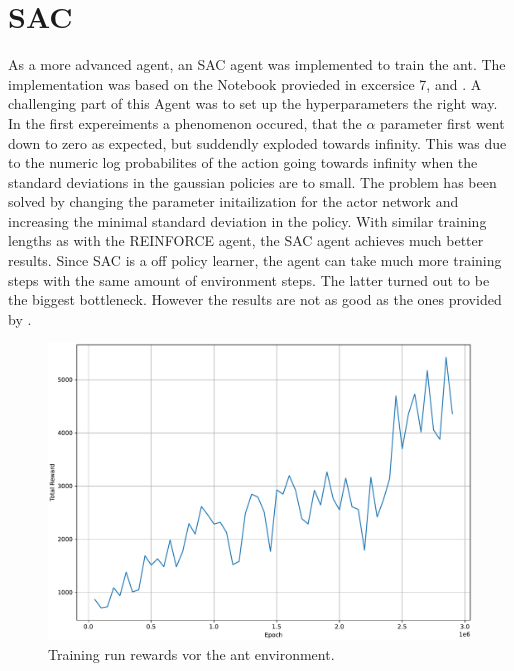 \documentclass[11pt, a4paper]{article}
\begin{document}
\newpage
\section{SAC}
As a more advanced agent, an SAC agent was implemented to train the ant.
The implementation was based on the Notebook provieded in excersice 7, and \cite{haarnoja2018soft}.
A challenging part of this Agent was to set up the hyperparameters the right way.
In the first expereiments a phenomenon occured, that the $\alpha$ parameter first went down to zero as
expected, but suddendly exploded towards infinity.
This was due to the numeric log probabilites of the action going towards infinity when the standard deviations
in the gaussian policies are to small.
The problem has been solved by changing the parameter initailization for the actor network and increasing the minimal
standard deviation in the policy.
With similar training lengths as with the REINFORCE agent, the SAC agent achieves much better results.
Since SAC is a off policy learner, the agent can take much more training steps with the same amount of environment steps.
The latter turned out to be the biggest bottleneck.
However the results are not as good as the ones provided by \cite{haarnoja2018soft}.

\begin{figure}
    \centering
    \includegraphics[width=15cm]{test.pdf}
    \caption{Training run rewards vor the ant environment.}
    \label{SAC:test}
\end{figure}
\end{document}
